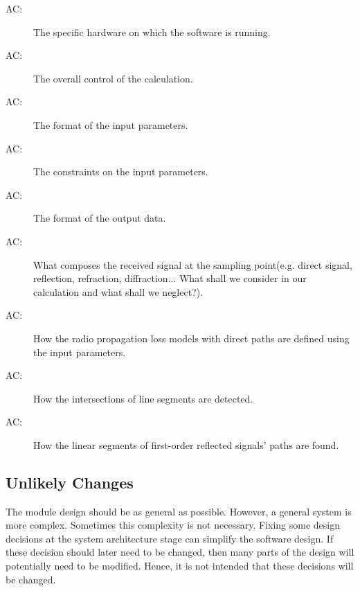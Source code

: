 \documentclass[12pt, titlepage]{article}
\newcounter{acnum}
\newcommand{\actheacnum}{AC\theacnum}
\begin{document}
\begin{description}
\item[ \actheacnum \label{acHardware}:] The specific
  hardware on which the software is running.
\item[ \actheacnum \label{acControl}:] The overall control of the calculation.
\item[ \actheacnum \label{acInputParam}:] The format of the
  input parameters.
\item[ \actheacnum \label{acInputConstr}:] The constraints on the
  input parameters.
\item[ \actheacnum \label{acOutputParam}:] The format of the
  output data.
\item[ \actheacnum \label{acSignalCompose}:] What composes the received signal at the sampling point(e.g. direct signal, reflection, refraction, diffraction... What shall we consider in our calculation and what shall we neglect?).
\item[ \actheacnum \label{acDirectLoss}:] How the radio propagation loss models with direct paths are defined using the input parameters.
\item[ \actheacnum \label{acIntersection}:] How the intersections of line segments are detected.
\item[ \actheacnum \label{acPathSegments}:] How the linear segments of first-order reflected signals' paths are found. 
\end{description}

\subsection{Unlikely Changes} \label{SecUchange}

The module design should be as general as possible. However, a general system is
more complex. Sometimes this complexity is not necessary. Fixing some design
decisions at the system architecture stage can simplify the software design. If
these decision should later need to be changed, then many parts of the design
will potentially need to be modified. Hence, it is not intended that these
decisions will be changed.
\end{document}
